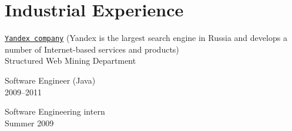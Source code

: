 \section{Industrial Experience}
\href{http://company.yandex.com/}{\tt Yandex company} (Yandex is the largest search engine in Russia and develops a number of Internet-based services and products)\\
Structured Web Mining Department
\begin{innerlist}
\item Software Engineer (Java)\\
  2009--2011
\item Software Engineering intern\\
  Summer 2009
\end{innerlist}

